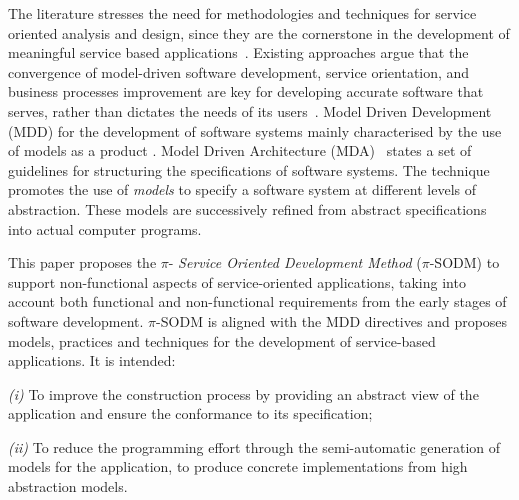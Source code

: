 




The literature stresses the need for methodologies and techniques for service oriented analysis and design, since they are the cornerstone in the development of meaningful service based applications~\cite{5}. Existing approaches argue that the convergence of model-driven software development, service orientation,   and  business processes improvement are key for developing accurate  software that serves, rather than dictates the needs of its users~\cite{watson}. Model Driven Development (MDD)  for the development of software systems mainly characterised by the use of models as a product \cite{Selic03}.
Model Driven Architecture (MDA)~\cite{miller} states a set of guidelines for structuring the specifications of software systems. The technique promotes  the use of \textit{models} to specify a software system at different levels of abstraction.
These models are successively refined from abstract specifications into actual computer programs.

This paper proposes  the $\pi$-\textit{ Service Oriented Development Method} ($\pi$-SODM)
to support non-functional aspects of service-oriented applications, taking into account both functional and non-functional requirements from the early stages of software development.
$\pi$-SODM is aligned with the MDD directives and proposes models, practices and techniques for the development of service-based applications. It is intended:
\begin{trivlist}
\item \textit{(i)} To improve the construction process by providing an abstract view of the application and ensure the conformance to its specification;
\item \textit{(ii)} To reduce the programming effort through the semi-automatic generation of  models for the application, to produce concrete implementations from high abstraction models.
\end{trivlist}

